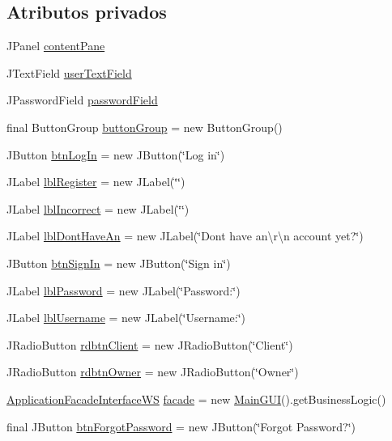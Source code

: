 \subsection*{Atributos privados}
\begin{DoxyCompactItemize}
\item 
J\+Panel \mbox{\hyperlink{classgui_1_1_login_g_u_i_aa1c9213d05aa2cf70dacbec422774f06}{content\+Pane}}
\item 
J\+Text\+Field \mbox{\hyperlink{classgui_1_1_login_g_u_i_acf4a83606449712f7d8e4e09eef07aee}{user\+Text\+Field}}
\item 
J\+Password\+Field \mbox{\hyperlink{classgui_1_1_login_g_u_i_a36a3a8140a1458add6a02dec5c6b4816}{password\+Field}}
\item 
final Button\+Group \mbox{\hyperlink{classgui_1_1_login_g_u_i_a61f34a13877bb80cedba5da01646e587}{button\+Group}} = new Button\+Group()
\item 
J\+Button \mbox{\hyperlink{classgui_1_1_login_g_u_i_aead0a4fab3d89616b6b53da28d73789c}{btn\+Log\+In}} = new J\+Button(\char`\"{}Log in\char`\"{})
\item 
J\+Label \mbox{\hyperlink{classgui_1_1_login_g_u_i_a1dc66beb3e76f805a9d2ba6c39b896ca}{lbl\+Register}} = new J\+Label(\char`\"{}\char`\"{})
\item 
J\+Label \mbox{\hyperlink{classgui_1_1_login_g_u_i_a575f68f00124a219bbc169d4c62f5f5d}{lbl\+Incorrect}} = new J\+Label(\char`\"{}\char`\"{})
\item 
J\+Label \mbox{\hyperlink{classgui_1_1_login_g_u_i_a7b7b08f790b49e4969565f9ba2395f3a}{lbl\+Dont\+Have\+An}} = new J\+Label(\char`\"{}Dont have an\textbackslash{}r\textbackslash{}n account yet?\char`\"{})
\item 
J\+Button \mbox{\hyperlink{classgui_1_1_login_g_u_i_a7e8b654313ae594bb8b02f128e2236a3}{btn\+Sign\+In}} = new J\+Button(\char`\"{}Sign in\char`\"{})
\item 
J\+Label \mbox{\hyperlink{classgui_1_1_login_g_u_i_a72713a536f5f8ddc5690c23dd54c987a}{lbl\+Password}} = new J\+Label(\char`\"{}Password\+:\char`\"{})
\item 
J\+Label \mbox{\hyperlink{classgui_1_1_login_g_u_i_af689de5c353e75b3523c706407a1bdf2}{lbl\+Username}} = new J\+Label(\char`\"{}Username\+:\char`\"{})
\item 
J\+Radio\+Button \mbox{\hyperlink{classgui_1_1_login_g_u_i_a0249903a45a937044e3e40875521b7fd}{rdbtn\+Client}} = new J\+Radio\+Button(\char`\"{}Client\char`\"{})
\item 
J\+Radio\+Button \mbox{\hyperlink{classgui_1_1_login_g_u_i_ad9b6b69331716f550fb139535ee5963a}{rdbtn\+Owner}} = new J\+Radio\+Button(\char`\"{}Owner\char`\"{})
\item 
\mbox{\hyperlink{interfacebusiness_logic_1_1_application_facade_interface_w_s}{Application\+Facade\+Interface\+WS}} \mbox{\hyperlink{classgui_1_1_login_g_u_i_a4abc22d6221d58bce5352dbe85b2d174}{facade}} = new \mbox{\hyperlink{classgui_1_1_main_g_u_i}{Main\+G\+UI}}().get\+Business\+Logic()
\item 
final J\+Button \mbox{\hyperlink{classgui_1_1_login_g_u_i_aa8694a27ad97904f1fb1566a14ab1b2f}{btn\+Forgot\+Password}} = new J\+Button(\char`\"{}Forgot Password?\char`\"{})
\end{DoxyCompactItemize}


